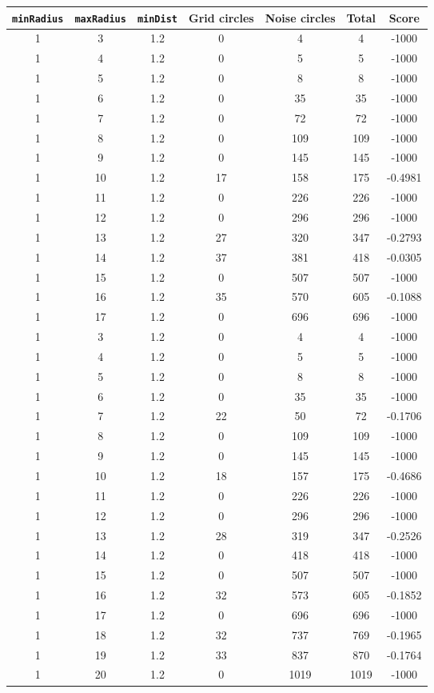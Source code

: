\documentclass[letterpaper, 12pt]{article}
\begin{document}
\begin{longtable}{|c|c|c|c|c|c|c|}
\hline
\textbf{\texttt{minRadius}} & \textbf{\texttt{maxRadius}} & \textbf{\texttt{minDist}} & \textbf{Grid circles} & \textbf{Noise circles} & \textbf{Total} & \textbf{Score} \\
\hline
1 & 3 & 1.2 & 0 & 4 & 4 & -1000 \\
\hline
1 & 4 & 1.2 & 0 & 5 & 5 & -1000 \\
\hline
1 & 5 & 1.2 & 0 & 8 & 8 & -1000 \\
\hline
1 & 6 & 1.2 & 0 & 35 & 35 & -1000 \\
\hline
1 & 7 & 1.2 & 0 & 72 & 72 & -1000 \\
\hline
1 & 8 & 1.2 & 0 & 109 & 109 & -1000 \\
\hline
1 & 9 & 1.2 & 0 & 145 & 145 & -1000 \\
\hline
1 & 10 & 1.2 & 17 & 158 & 175 & -0.4981 \\
\hline
1 & 11 & 1.2 & 0 & 226 & 226 & -1000 \\
\hline
1 & 12 & 1.2 & 0 & 296 & 296 & -1000 \\
\hline
1 & 13 & 1.2 & 27 & 320 & 347 & -0.2793 \\
\hline
1 & 14 & 1.2 & 37 & 381 & 418 & -0.0305 \\
\hline
1 & 15 & 1.2 & 0 & 507 & 507 & -1000 \\
\hline
1 & 16 & 1.2 & 35 & 570 & 605 & -0.1088 \\
\hline
1 & 17 & 1.2 & 0 & 696 & 696 & -1000 \\
\hline
1 & 3 & 1.2 & 0 & 4 & 4 & -1000 \\
\hline
1 & 4 & 1.2 & 0 & 5 & 5 & -1000 \\
\hline
1 & 5 & 1.2 & 0 & 8 & 8 & -1000 \\
\hline
1 & 6 & 1.2 & 0 & 35 & 35 & -1000 \\
\hline
1 & 7 & 1.2 & 22 & 50 & 72 & -0.1706 \\
\hline
1 & 8 & 1.2 & 0 & 109 & 109 & -1000 \\
\hline
1 & 9 & 1.2 & 0 & 145 & 145 & -1000 \\
\hline
1 & 10 & 1.2 & 18 & 157 & 175 & -0.4686 \\
\hline
1 & 11 & 1.2 & 0 & 226 & 226 & -1000 \\
\hline
1 & 12 & 1.2 & 0 & 296 & 296 & -1000 \\
\hline
1 & 13 & 1.2 & 28 & 319 & 347 & -0.2526 \\
\hline
1 & 14 & 1.2 & 0 & 418 & 418 & -1000 \\
\hline
1 & 15 & 1.2 & 0 & 507 & 507 & -1000 \\
\hline
1 & 16 & 1.2 & 32 & 573 & 605 & -0.1852 \\
\hline
1 & 17 & 1.2 & 0 & 696 & 696 & -1000 \\
\hline
1 & 18 & 1.2 & 32 & 737 & 769 & -0.1965 \\
\hline
1 & 19 & 1.2 & 33 & 837 & 870 & -0.1764 \\
\hline
1 & 20 & 1.2 & 0 & 1019 & 1019 & -1000 \\
\hline
\end{longtable}
\end{document}
